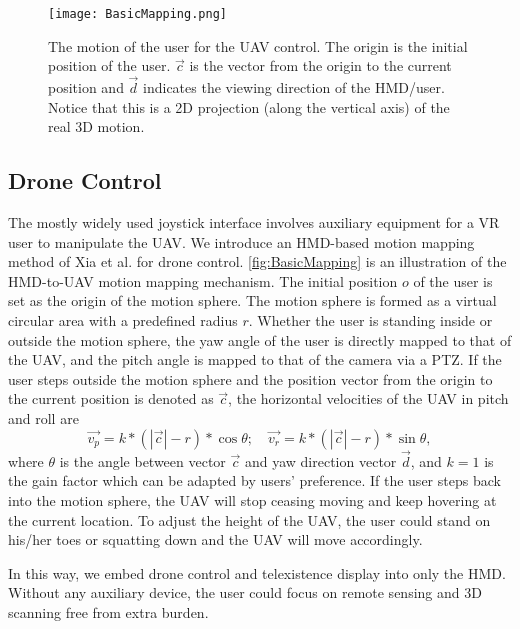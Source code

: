 \documentclass[journal]{IEEEtran}
\begin{document}
\begin{figure}[t]
  \centering
  \texttt{[image: BasicMapping.png]}
  \caption{The motion of the user for the UAV control. The origin is the initial
  position of the user. $\vec{c}$ is the vector from the origin to the current position and $\vec{d}$ indicates the viewing direction of the HMD/user. Notice that this is a 2D projection (along the vertical axis) of the real 3D motion. }
  \label{fig:BasicMapping}
\end{figure}

\subsection{Drone Control}
\label{subsec:mapping}
The mostly widely used joystick interface involves auxiliary 
equipment for a VR user to manipulate the UAV. 
We introduce an HMD-based motion mapping method of Xia et al. \cite{8797791} 
for drone control. \autoref{fig:BasicMapping} is an illustration 
of the HMD-to-UAV motion mapping mechanism.
The initial position $o$ of the user is set as the origin of the motion sphere.
The motion sphere is formed as a virtual circular area with a predefined radius 
$r$. Whether the user is standing inside or outside the motion sphere, the yaw 
angle of the user is directly mapped to that of the UAV, and the pitch angle is 
mapped to that of the camera via a PTZ. 
If the user steps outside the motion sphere and the position vector from the origin 
to the current position is denoted as $\vec{c}$, the horizontal velocities of the UAV in pitch and 
roll are 
\begin{equation}
  \vec{v_p}=k*(\left|\vec{c}\right|-r)*\cos\theta; \quad \vec{v_r}=k*(\left|\vec{c}\right|-r)*\sin\theta,
\end{equation}
where $\theta$ is the angle between vector $\vec{c}$ and yaw direction 
vector $\vec{d}$, and $k=1$ is the gain factor which can be adapted by users'
preference.
If the user steps back into the motion sphere, the UAV will stop ceasing moving 
and keep hovering at the current location.
To adjust the height of the UAV, the user could stand on his/her toes or 
squatting down and the UAV will move accordingly.

In this way, we embed drone control and telexistence display into only the HMD.
Without any auxiliary device, the user could focus on remote sensing and 3D scanning 
free from extra burden.

\end{document}
